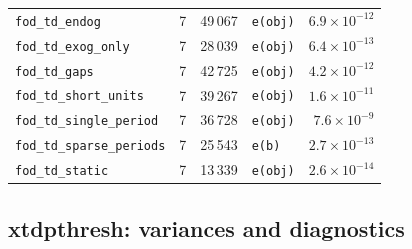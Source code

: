 \documentclass[10.5pt,a4paper]{article}
\begin{document}
\begin{longtable}{@{}p{3.6cm}rrp{4.9cm}r@{}}
\texttt{fod\_\allowbreak{}td\_\allowbreak{}endog} & 7 & 49\,067 & \texttt{e(obj)} & $6.9\times10^{-12}$ \\
\texttt{fod\_\allowbreak{}td\_\allowbreak{}exog\_\allowbreak{}only} & 7 & 28\,039 & \texttt{e(obj)} & $6.4\times10^{-13}$ \\
\texttt{fod\_\allowbreak{}td\_\allowbreak{}gaps} & 7 & 42\,725 & \texttt{e(obj)} & $4.2\times10^{-12}$ \\
\texttt{fod\_\allowbreak{}td\_\allowbreak{}short\_\allowbreak{}units} & 7 & 39\,267 & \texttt{e(obj)} & $1.6\times10^{-11}$ \\
\texttt{fod\_\allowbreak{}td\_\allowbreak{}single\_\allowbreak{}period} & 7 & 36\,728 & \texttt{e(obj)} & $7.6\times10^{-9}$ \\
\texttt{fod\_\allowbreak{}td\_\allowbreak{}sparse\_\allowbreak{}periods} & 7 & 25\,543 & \texttt{e(b)} & $2.7\times10^{-13}$ \\
\texttt{fod\_\allowbreak{}td\_\allowbreak{}static} & 7 & 13\,339 & \texttt{e(obj)} & $2.6\times10^{-14}$ \\
\bottomrule
\end{longtable}

\subsection*{xtdpthresh: variances and diagnostics}
\end{document}
